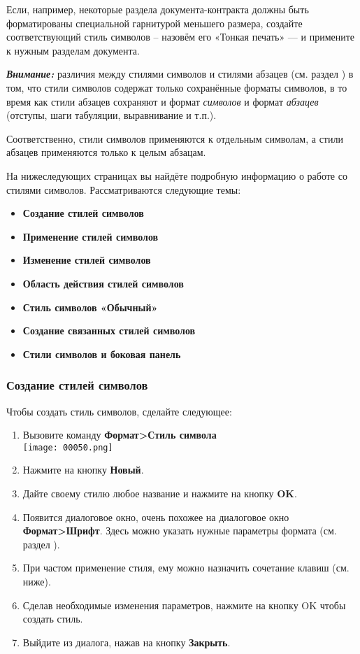 ﻿\documentclass[a4paper,10pt]{article}
\begin{document}
Если, например, некоторые раздела документа-контракта должны быть форматированы специальной гарнитурой меньшего размера, создайте соответствующий стиль символов -- назовём его «Тонкая печать» — и примените к нужным разделам документа.

\textbf{\textit{Внимание:}} различия между стилями символов и стилями абзацев (см. раздел ) в том, что стили символов содержат только сохранённые форматы символов, в то время как стили абзацев сохраняют и формат \textit{символов} и формат \textit{абзацев} (отступы, шаги табуляции, выравнивание и т.п.).

Соответственно, стили символов применяются к отдельным символам, а стили абзацев применяются только к целым абзацам.

На нижеследующих страницах вы найдёте подробную информацию о работе со стилями символов. Рассматриваются следующие темы:
\begin{itemize}
 \item \textbf{Создание стилей символов}
 \item \textbf{Применение стилей символов}
 \item \textbf{Изменение стилей символов}
 \item \textbf{Область действия стилей символов}
 \item \textbf{Стиль символов «Обычный»}
 \item \textbf{Создание связанных стилей символов}
 \item \textbf{Стили символов и боковая панель}
\end{itemize}

\subsubsection{Создание стилей символов}
Чтобы создать стиль символов, сделайте следующее:
\begin{enumerate}
 \item Вызовите команду \textbf{Формат>Стиль символа}\\
 \texttt{[image: 00050.png]}
 \item Нажмите на кнопку \textbf{Новый}.
 \item Дайте своему стилю любое название и нажмите на кнопку \textbf{OK}.
 \item Появится диалоговое окно, очень похожее на диалоговое окно \textbf{Формат>Шрифт}. Здесь можно указать нужные параметры формата (см. раздел ).
 \item При частом применение стиля, ему можно назначить сочетание клавиш (см. ниже).
 \item Сделав необходимые изменения параметров, нажмите на кнопку OK чтобы создать стиль.
 \item Выйдите из диалога, нажав на кнопку \textbf{Закрыть}.
\end{enumerate}
\end{document}
